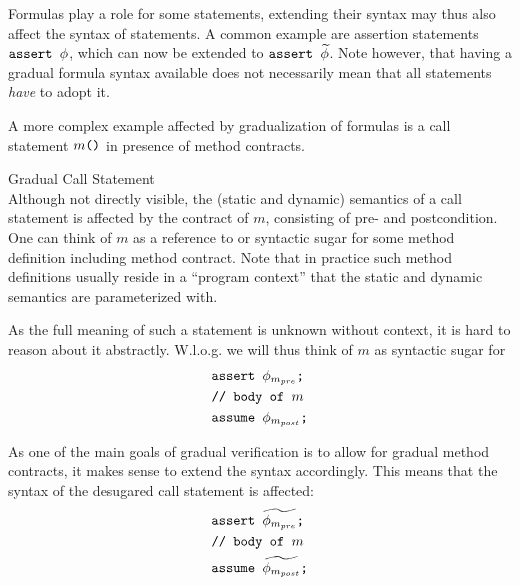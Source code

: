 Formulas play a role for some statements, extending their syntax may thus also affect the syntax of statements.
A common example are assertion statements $\textup{\texttt{assert $\phi$}}$, which can now be extended to $\textup{\texttt{assert $\widetilde{\phi}$}}$.
Note however, that having a gradual formula syntax available does not necessarily mean that all statements \emph{have} to adopt it.

A more complex example affected by gradualization of formulas is a call statement $\textup{\texttt{$m$()}}$ in presence of method contracts.
\begin{example}{Gradual Call Statement}~\\
    Although not directly visible, the (static and dynamic) semantics of a call statement is affected by the contract of $m$, consisting of pre- and postcondition.
    One can think of $m$ as a reference to or syntactic sugar for some method definition including method contract.
    Note that in practice such method definitions usually reside in a “program context” that the static and dynamic semantics are parameterized with.
    
    As the full meaning of such a statement is unknown without context, it is hard to reason about it abstractly.
    W.l.o.g. we will thus think of $m$ as syntactic sugar for 
    \begin{align*}
    &\textup{\texttt{assert $\phi_{m_{pre}}$;}}\\
    &\textup{\texttt{// body of $m$}}\\
    &\textup{\texttt{assume $\phi_{m_{post}}$;}}
    \end{align*}
    
    As one of the main goals of gradual verification is to allow for gradual method contracts, it makes sense to extend the syntax accordingly.
    This means that the syntax of the desugared call statement is affected:
    \begin{align*}
    &\textup{\texttt{assert $\widetilde{\phi_{m_{pre}}}$;}}\\
    &\textup{\texttt{// body of $m$}}\\
    &\textup{\texttt{assume $\widetilde{\phi_{m_{post}}}$;}}
    \end{align*}
\end{example}

